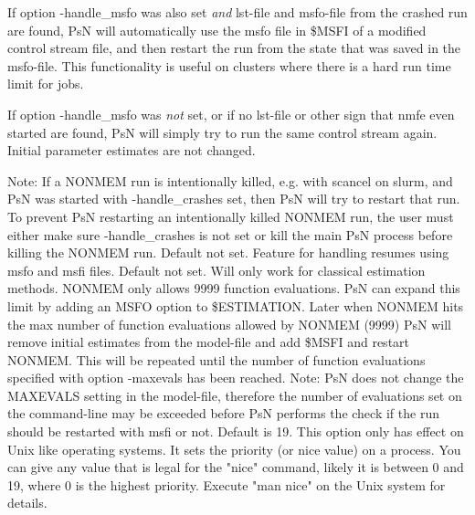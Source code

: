 \begin{optionlist}
If option -handle\_msfo was also set \emph{and} lst-file and msfo-file from the crashed run are found, PsN will automatically use the msfo file in \$MSFI of a modified control stream file, and then restart the run from the state that was saved in the msfo-file.
This functionality is useful on clusters where there is a hard run time limit for jobs.

If option -handle\_msfo was \emph{not} set, or if no lst-file or other sign that nmfe even started are found, PsN will simply try to run the same control stream again. Initial parameter estimates are not changed.  

Note: If a NONMEM run is intentionally killed, e.g. with scancel on slurm, and PsN was started with -handle\_crashes set, then PsN will try to restart that run. To prevent PsN restarting an intentionally killed NONMEM run, the user must either make sure -handle\_crashes is not set or kill the main PsN process before killing the NONMEM run.
\nextopt
{}
Default not set. Feature for handling resumes using msfo and msfi files. 
\nextopt
{}
Default not set. Will only work for classical estimation methods. NONMEM only allows 9999 function evaluations. PsN can expand this limit by adding an MSFO option to \$ESTIMATION. Later when NONMEM hits the max number of function evaluations allowed by NONMEM (9999) PsN will remove initial estimates from the model-file and add \$MSFI and restart NONMEM. This will be repeated until the number of function evaluations specified with option -maxevals has been reached. Note: PsN does not change the MAXEVALS setting in the model-file, therefore the number of evaluations set on the command-line may be exceeded before PsN performs the check if the run should be restarted with msfi or not. 
\nextopt
{}
Default is 19. This option only has effect on Unix like operating systems. It  sets the priority (or nice value) on a process. You can give any value that is legal for the "nice" command, likely it is between 0 and 19, where 0 is the highest priority. Execute "man nice" on the Unix system for details. 
\nextopt
\end{optionlist}
